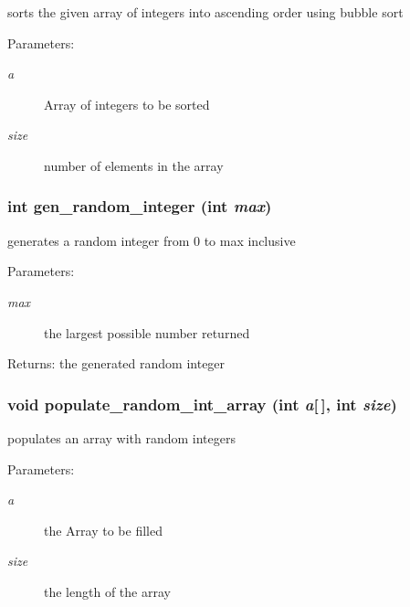 sorts the given array of integers into ascending order using bubble sort \begin{Desc}
\item[Parameters:]
\begin{description}
\item[{\em a}]Array of integers to be sorted \item[{\em size}]number of elements in the array \end{description}
\end{Desc}
\subsubsection{\setlength{\rightskip}{0pt plus 5cm}int gen\_\-random\_\-integer (int {\em max})}\label{sort_8c_622b7a4e3e97d78fa153b5df9d88b4d6}


generates a random integer from 0 to max inclusive \begin{Desc}
\item[Parameters:]
\begin{description}
\item[{\em max}]the largest possible number returned \end{description}
\end{Desc}
\begin{Desc}
\item[Returns:]the generated random integer \end{Desc}
\subsubsection{\setlength{\rightskip}{0pt plus 5cm}void populate\_\-random\_\-int\_\-array (int {\em a}[$\,$], int {\em size})}\label{sort_8c_72431984f0a72adacd12dae0d0ff3b1e}


populates an array with random integers \begin{Desc}
\item[Parameters:]
\begin{description}
\item[{\em a}]the Array to be filled \item[{\em size}]the length of the array \end{description}
\end{Desc}
